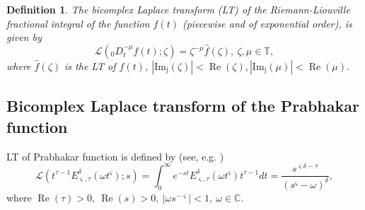\documentclass[a4paper,12pt]{article}
\newtheorem{definition}[theorem]{Definition}
\theoremstyle{remark}
\begin{document}
\begin{definition}
    The bicomplex Laplace transform (LT) 	of the Riemann-Liouville fractional integral \cite{agarwal2023bicomplex} of the function $f(t)$ (piecewise and of exponential order), is given by
\begin{equation}\label{eq:LT-fracD}
\mathcal{L}\left(  _0D^{-\mu}_tf(t);\zeta \right) =\zeta^{-\mu}\hat{f}(\zeta),~\zeta ,\mu\in\mathbb{T},
\end{equation}
where $ \hat{f}(\zeta)$ is the LT of $f( t)$, $|\operatorname{Im_j}(\zeta )|<\operatorname{Re}(\zeta ),$$|\operatorname{Im_j}(\mu)|<\operatorname{Re}(\mu).$ 

\end{definition}
\subsection{ Bicomplex Laplace transform of the Prabhakar function}
LT of Prabhakar function is defined by (see, e.g. \cite{gorenflo2014,kilbas2006})
\begin{equation}\label{eq lt 3 para}
\mathcal{L}(t^{\tau-1}E_{ \varsigma,\tau}^\delta(\omega t^{ \varsigma});s)=\int_{0}^{\infty}e^{-st}E_{ \varsigma, \tau}^\delta(\omega  t^{ \varsigma})t^{\tau-1}dt=\frac{s^{ \varsigma\delta-\tau}}{(s^{ \varsigma}-\omega)^\delta},
\end{equation}
where $ \operatorname{Re}(\tau) > 0, ~\operatorname{Re}(s) > 0,~ |\omega s^{- \varsigma}|<1,~\omega \in\mathbb{C}.$\\
\end{document}
